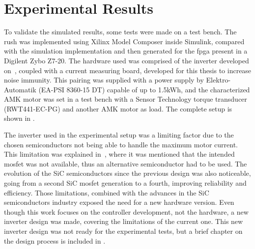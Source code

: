 \section{Experimental Results}
\label{section:experimental}%
\vfill

To validate the simulated results, some tests were made on a test bench. The \gls{rush} was implemented using Xilinx Model Composer inside Simulink, compared with the simulation implementation and then generated for the \gls{fpga} present in a Digilent Zybo Z7-20. The hardware used was comprised of the inverter developed on~\cite{Costa:MSc}, coupled with a current measuring board, developed for this thesis to increase noise immunity. This pairing was supplied with a power supply by Elektro-Automatik (EA-PSI 8360-15 DT) capable of up to 1.5kWh, and the characterized AMK motor was set in a test bench with a Sensor Technology torque transducer (RWT441-EC-PG) and another AMK motor as load. The complete setup is shown in .

The inverter used in the experimental setup was a limiting factor due to the chosen semiconductors not being able to handle the maximum motor current. This limitation was explained in~\cite{Costa:MSc}, where it was mentioned that the intended mosfet was not available, thus an alternative semiconductor had to be used. The evolution of the SiC semiconductors since the previous design was also noticeable, going from a second SiC mosfet generation to a fourth, improving reliability and efficiency. Those limitations, combined with the advances in the SiC semiconductors industry exposed the need for a new hardware version. Even though this work focuses on the controller development, not the hardware, a new inverter design was made, covering the limitations of the current one. This new inverter design was not ready for the experimental tests, but a brief chapter on the design process is included in .

